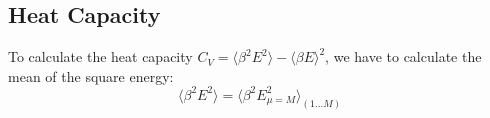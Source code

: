 \subsection{Heat Capacity}


To calculate the heat capacity $C_V=\langle\beta^2E^2\rangle-
\langle\beta E\rangle^2$, we have to calculate the mean of the square energy:
\begin{equation}
\langle \beta^2 E^2 \rangle =
\langle \beta^2 E^2_{\mu=M} \rangle_{(1\dots M)}\nonumber
\end{equation}

